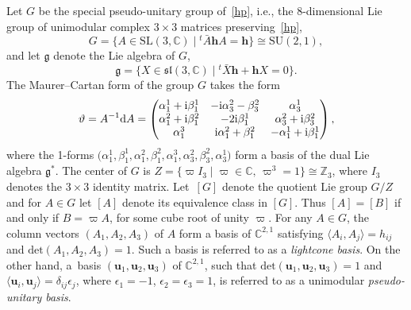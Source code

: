 \documentclass[10pt,a4paper]{amsart}
\numberwithin{equation}{section}
\def\C{\mathbb{C}}
\begin{document}
Let $G$ be the special pseudo-unitary group of~\eqref{hp},
i.e., the 8-dimensional Lie group
of unimodular complex $3 \times 3$ matrices
preserving~\eqref{hp},
\begin{equation*}%
G = \big\{ A \in \mathrm{SL}(3,\mathbb C) \mid {^t\!\bar{A}}\mathbf h A = \mathbf h\big\} \cong \mathrm{SU}(2,1),
\end{equation*}
%
and let $\mathfrak g$ denote the Lie algebra of $G$,
\begin{equation*}%
\mathfrak g = \big\{ X \in \mathfrak{sl}(3,\mathbb C) \mid {^t\!\bar{X}}\mathbf h + \mathbf h X = 0\big\}.
\end{equation*}
%
The Maurer--Cartan form of the group $G$ takes the form
\begin{equation*}
\vartheta = A^{-1}{\rm d}A =\begin{pmatrix}
\alpha_1^1 +{\rm i} \beta_1^1 & -{\rm i} \alpha_3^2 - \beta_3^2 & \alpha_3^1\\
\alpha_1^2 +{\rm i} \beta_1^2 &-2{\rm i} \beta_1^1 & \alpha_3^2 +{\rm i}\beta_3^2 \\
 \alpha_1^3 &{\rm i} \alpha_1^2 + \beta_1^2& -\alpha_1^1 +{\rm i} \beta_1^1\\
\end{pmatrix},
\end{equation*}
where the 1-forms
$
 \big(\alpha_1^1 , \beta_1^1 , \alpha_1^2 , \beta_1^2 ,\alpha_1^3 , \alpha_3^2 , \beta_3^2 , \alpha_3^1\big)
 $
form a basis of the dual Lie algebra ${\mathfrak g}^*$.
%
The center of $G$ is $Z = \big\{\varpi I_3\mid \varpi \in \mathbb C, \,\varpi^3 =1\big\}\cong \mathbb Z_3$, where
$I_3$ denotes the $3\times 3$ identity matrix. Let~$[G]$ denote the quotient Lie
group $G/Z$ and for $A\in G$ let $[A]$ denote its equivalence class in $[G]$.
Thus $[A] = [B]$ if and only if $B = \varpi A$, for some cube root
of unity $\varpi$.
%
For any $A\in G$, the column vectors $(A_1, A_2, A_3)$ of $A$ form a basis of $\C^{2,1}$
satisfying $\langle A_i, A_j \rangle = h_{ij}$ and $\mathrm{det}(A_1, A_2, A_3) =1$. Such a basis is
referred to as a
{\em lightcone basis}.
%
On the other hand, a~basis $(\mathbf{u}_1, \mathbf{u}_2, \mathbf{u}_3)$ of $\C^{2,1}$,
such that $\mathrm{det}(\mathbf{u}_1, \mathbf{u}_2, \mathbf{u}_3) =1$ and
$\langle \mathbf{u}_i, \mathbf{u}_j \rangle = \delta_{ij}\epsilon_j$, where
$\epsilon_1 = -1$, $\epsilon_2 = \epsilon_3 = 1$,
is referred to as a unimodular {\em pseudo-unitary basis}.
\end{document}
